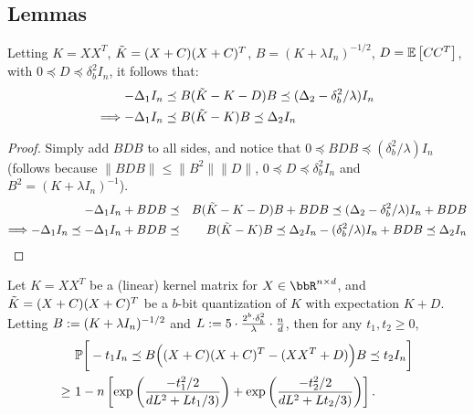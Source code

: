 \subsection{Lemmas}
\begin{lemma}
	\label{lem1}
	Letting $K=XX^T$, $\tK = (X+C)(X+C)^T$, $B = (K+\lambda I_n)^{-1/2}$, $D = \expect{}{CC^T}$, with $0 \preceq D \preceq \delta_b^2 I_n$, it follows that:
	\begin{align*}
-\Delta_1 I_n &\preceq B (\tK - K - D) B \preceq
(\Delta_2 - \delta^2_b/\lambda) I_n \\
\Longrightarrow -\Delta_1 I_n &\preceq B (\tK - K) B \preceq
\Delta_2 I_n
	\end{align*}
\end{lemma}
\begin{proof}
Simply add $BDB$ to all sides, and notice that $0 \preceq BDB \preceq (\delta_b^2/\lambda) I_n$ (follows because $\|BDB\| \leq \|B^2\| \|D\|$, $0 \preceq D \preceq \delta_b^2 I_n$ and $B^2 = (K+\lambda I_n)^{-1}$).
\begin{eqnarray*}
-\Delta_1 I_n + BDB &\preceq& B (\tK - K - D) B  + BDB \preceq
(\Delta_2 - \delta^2_b/\lambda) I_n  + BDB \\
\Longrightarrow -\Delta_1 I_n \preceq  -\Delta_1 I_n + BDB &\preceq& B (\tK - K) B \preceq
\Delta_2 I_n - (\delta_b^2/\lambda) I_n  + BDB \preceq \Delta_2 I_n
\end{eqnarray*}
\end{proof}


\begin{lemma}
	Let $K=XX^T$ be a (linear) kernel matrix for $X \in\RR^{n \times d}$, and $\tK = (X+C)(X+C)^T$ be a $b$-bit quantization of $K$ with expectation $K+D$.
	Letting $B\defeq (K+\lambda I_n)^{-1/2}$ and $L \defeq 5 \cdot \frac{2^b \cdot \delta_b^2}{\lambda}\cdot  \frac{n}{d}$, then for any $t_1, t_2 \geq 0$,
	\begin{align*}
	&\Prob\bigg[- t_1 I_n \preceq B\Big((X + C)(X + C)^T - (XX^T+D)\Big)B \preceq t_2 I_n\bigg] \\
	\geq\ &1 - n \left[ \exp \left( \frac{-t_1^2/2}{dL^2 +
		Lt_1/3)} \right) + \exp \left(\frac{-t_2^2/2}{dL^2 + Lt_2/3)} \right)  \right].
	\end{align*}
	\label{lem:quantized_concentration_two_sided}
\end{lemma}

